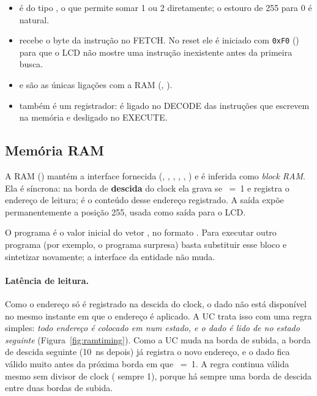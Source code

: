 \begin{itemize}[nosep]
  \item {} é do tipo , o que permite somar 1 ou 2
        diretamente; o estouro de 255 para 0 é natural.
  \item {} recebe o byte da instrução no FETCH. No reset ele é iniciado
        com \texttt{0xF0} () para que o LCD não mostre uma instrução
        inexistente antes da primeira busca.
  \item {} e  são as únicas ligações com a RAM
        (, ).
  \item {} também é um registrador: é ligado no DECODE das instruções que
        escrevem na memória e desligado no EXECUTE.
\end{itemize}

\subsection{Memória RAM}
\label{sec:ram}

A RAM () mantém a interface fornecida (, ,
, , , ) e é inferida como
\emph{block RAM}. Ela é síncrona: na borda de \textbf{descida} do clock ela
grava  se ~=~1 e registra o endereço de leitura;  é o
conteúdo desse endereço registrado. A saída  expõe
permanentemente a posição 255, usada como saída para o LCD.

O programa é o valor inicial do vetor , no formato
. Para executar outro programa (por exemplo, o
programa surpresa) basta substituir esse bloco e sintetizar novamente; a
interface da entidade não muda.

\paragraph{Latência de leitura.} Como o endereço só é registrado na descida do
clock, o dado não está disponível no mesmo instante em que o endereço é
aplicado. A UC trata isso com uma regra simples: \emph{todo endereço é colocado
em  num estado, e o dado é lido de  no estado seguinte}
(Figura~\ref{fig:ramtiming}). Como a UC muda  na borda de subida, a
borda de descida seguinte (\SI{10}{\nano\second} depois) já registra o novo
endereço, e o dado fica válido muito antes da próxima borda em que ~=~1.
A regra continua válida mesmo sem divisor de clock ( sempre 1), porque
há sempre uma borda de descida entre duas bordas de subida.

